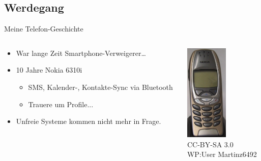 \documentclass{beamer}
\begin{document}
\subsection{Werdegang}
\begin{frame}{Meine Telefon-Geschichte}

\begin{columns}[c]
  \begin{column}[T]{.72\textwidth}
    \begin{itemize}
      \item War lange Zeit Smartphone-Verweigerer\dots
      \item 10 Jahre Nokia 6310i
        \begin{itemize}
          \item SMS, Kalender-, Kontakte-Sync via Bluetooth
          \item Trauere um Profile...
        \end{itemize}
      \item Unfreie Systeme kommen nicht mehr in Frage.
    \end{itemize}
  \end{column}
  \begin{column}[T]{.28\textwidth}
  \vspace{-2.5cm}
    \includegraphics[width=2cm]{nokia.png} \\
    {\TINY \vspace{.05cm}CC-BY-SA 3.0 \\ \vspace{-.25cm} WP:User Martinz6492}
 \end{column}
\end{columns}


\end{frame}
\end{document}
